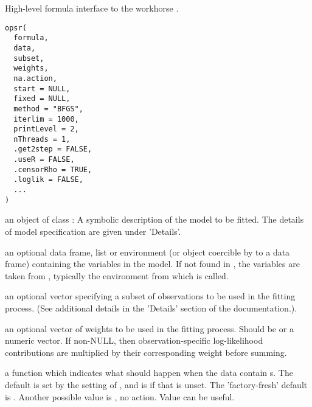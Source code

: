 
%
\begin{Description}
High-level formula interface to the workhorse .
\end{Description}
%
\begin{Usage}
\begin{verbatim}
opsr(
  formula,
  data,
  subset,
  weights,
  na.action,
  start = NULL,
  fixed = NULL,
  method = "BFGS",
  iterlim = 1000,
  printLevel = 2,
  nThreads = 1,
  .get2step = FALSE,
  .useR = FALSE,
  .censorRho = TRUE,
  .loglik = FALSE,
  ...
)
\end{verbatim}
\end{Usage}
%
\begin{Arguments}
\begin{ldescription}
\item[\code{formula}] an object of class : A symbolic description
of the model to be fitted. The details of model specification are given under
'Details'.

\item[\code{data}] an optional data frame, list or environment (or object coercible by
 to a data frame) containing the variables in the model. If
not found in , the variables are taken from ,
typically the environment from which  is called.

\item[\code{subset}] an optional vector specifying a subset of observations to be used
in the fitting process. (See additional details in the 'Details' section of
the  documentation.).

\item[\code{weights}] an optional vector of weights to be used in the fitting process.
Should be  or a numeric vector. If non-NULL, then observation-specific
log-likelihood contributions are multiplied by their corresponding weight
before summing.

\item[\code{na.action}] a function which indicates what should happen when the data
contain s. The default is set by the  setting of ,
and is  if that is unset. The 'factory-fresh' default is .
Another possible value is , no action. Value  can be useful.


\end{ldescription}
\end{Arguments}
